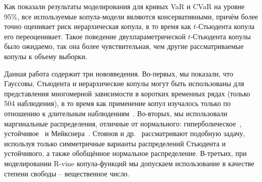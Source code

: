 Как показали результаты моделирования для кривых VaR и CVaR на уровне 95\%, все используемые копула-модели являются консервативными, причём более точно оценивает риск иерархическая копула, в то время как $t$-Стьюдента копула его переоценивает.
Такое поведение двухпараметрической $t$-Стьюдента копулы было ожидаемо, так она более чувствительная, чем другие рассматриваемые копулы к объему выборки.

Данная работа содержит три нововведения.
Во-первых, мы показали, что Гауссовы, Стьюдента и иерархические копулы могут быть использованы для представления многомерной зависимости в коротких временных рядах (только 504 наблюдения), в то время как применение копул изучалось только по отношению к длительным наблюдениям~\cite{Dissmann2013, Kole2007, Lourme2016}.
Во-вторых, мы использовали маргинальные распределения, отличные от нормального: гиперболическое~\cite{Barndoff1983}, устойчивое~\cite{Rachev2005} и Мейкснера~\cite{Schoutens2002}. Стоянов и др.~\cite{Stoyanov2013} рассматривают подобную задачу, используя только симметричные варианты распределений Стьюдента и устойчивого, а также обобщённое нормальное распределение.
В-третьих, при моделировании R-vine копула-функций мы допускаем использование в качестве  степени свободы -- вещественное число. 


